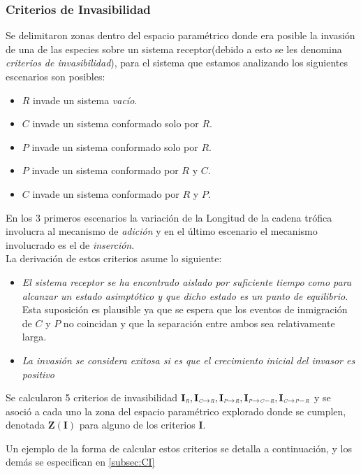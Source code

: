 \subsubsection{Criterios de Invasibilidad}\label{subsubsec:Inv}
Se delimitaron zonas dentro del espacio param\'etrico donde era posible la invasi\'on de una de las especies sobre un sistema receptor(debido a esto se les denomina \emph{criterios de invasibilidad}), para el sistema que estamos analizando los siguientes escenarios son posibles: 
\begin{itemize}
\item $R$ invade un sistema \emph{vac\'io}.
\item $C$ invade un sistema conformado solo por $R$.
\item $P$ invade un sistema conformado solo por $R$.
\item $P$ invade un sistema conformado por $R$ y $C$.
\item $C$ invade un sistema conformado por $R$ y $P$.
\end{itemize}
En los 3 primeros escenarios la variaci\'on de la Longitud de la cadena tr\'ofica involucra al mecanismo de \textit{adici\'on} y en el \'ultimo escenario el mecanismo involucrado es el de \textit{inserci\'on}.\\

La derivaci\'on de estos criterios asume lo siguiente:
\begin{itemize}
\item \emph{El sistema receptor se ha encontrado aislado por suficiente tiempo como para alcanzar un estado asimpt\'otico y que dicho estado es un punto de equilibrio}.\\Esta suposici\'on es plausible ya que se espera que los eventos de inmigraci\'on de $C$ y $P$ no coincidan y que la separaci\'on entre ambos sea relativamente larga.
\item \emph{La invasi\'on se considera exitosa si es que el crecimiento inicial del invasor es positivo}
\end{itemize}

Se calcularon 5 criterios de invasibilidad $\mathbf{I_{\textit{\tiny R}},I_{\textit{\tiny C} \to \textit{\tiny R}},I_{\textit{\tiny P} \to \textit{\tiny R}},I_{\textit{\tiny P} \to \textit{\tiny C}-\textit{\tiny R}},I_{\textit{\tiny C} \to \textit{\tiny P}-\textit{\tiny R}}}$ y se asoci\'o a cada uno la zona del espacio param\'etrico explorado donde se cumplen, denotada $\mathbf{Z(I)}$ para alguno de los criterios $\mathbf{I}$.

Un ejemplo de la forma de calcular estos criterios se detalla a continuaci\'on, y los dem\'as se especifican en \ref{subsec:CI} 

